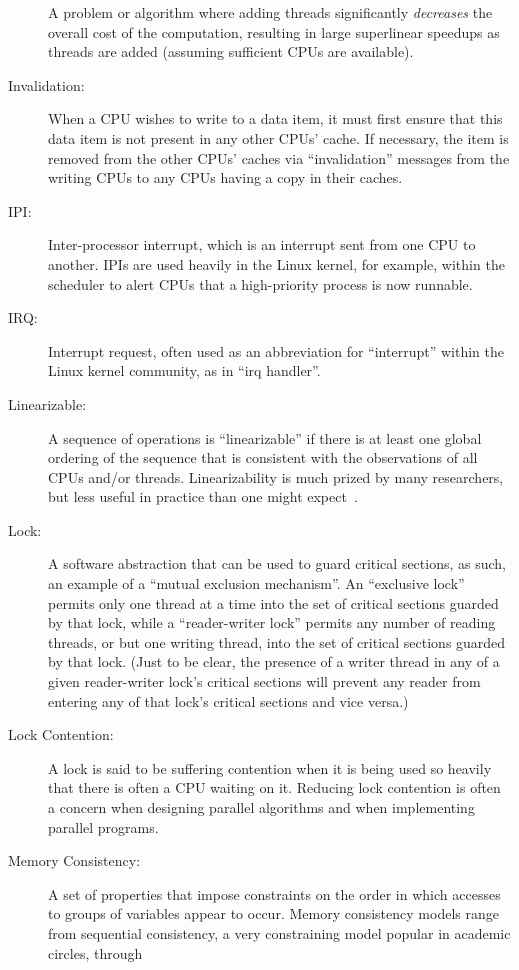 \begin{description}
	A problem or algorithm where adding threads significantly
	\emph{decreases} the overall cost of the computation, resulting in
	large superlinear speedups as threads are added (assuming sufficient
	CPUs are available).
\item[Invalidation:]
	When a CPU wishes to write to a data item, it must first ensure
	that this data item is not present in any other CPUs' cache.
	If necessary, the item is removed from the other CPUs' caches
	via ``invalidation'' messages from the writing CPUs to any
	CPUs having a copy in their caches.
\item[IPI:]
	Inter-processor interrupt, which is an
	interrupt sent from one CPU to another.
	IPIs are used heavily in the Linux kernel, for example, within
	the scheduler to alert CPUs that a high-priority process is now
	runnable.
\item[IRQ:]
	Interrupt request, often used as an abbreviation for ``interrupt''
	within the Linux kernel community, as in ``irq handler''.
\item[Linearizable:]
	A sequence of operations is ``linearizable'' if there is at
	least one global ordering of the sequence that is consistent
	with the observations of all CPUs and/or threads.
	Linearizability is much prized by many researchers, but less
	useful in practice than one might
	expect~\cite{AndreasHaas2012FIFOisnt}.
\item[Lock:]
	A software abstraction that can be used to guard critical sections,
	as such, an example of a ``mutual exclusion mechanism''.
	An ``exclusive lock'' permits only one thread at a time into the
	set of critical sections guarded by that lock, while a
	``reader-writer lock'' permits any number of reading
	threads, or but one writing thread, into the set of critical
	sections guarded by that lock.  (Just to be clear, the presence
	of a writer thread in any of a given reader-writer lock's
	critical sections will prevent any reader from entering
	any of that lock's critical sections and vice versa.)
\item[Lock Contention:]
	A lock is said to be suffering contention when it is being
	used so heavily that there is often a CPU waiting on it.
	Reducing lock contention is often a concern when designing
	parallel algorithms and when implementing parallel programs.
\item[Memory Consistency:]
	A set of properties that impose constraints on the order in
	which accesses to groups of variables appear to occur.
	Memory consistency models range from sequential consistency,
	a very constraining model popular in academic circles, through

\end{description}
